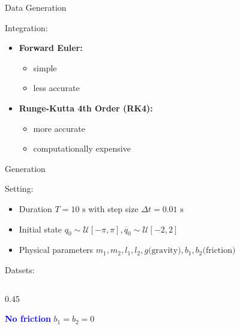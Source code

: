 \begin{frame}{Data Generation}

    Integration:
    \vspace{1ex} %
    \begin{itemize}
        \item \textbf{Forward Euler:}
        \begin{itemize}
            \item[\textcolor{ForestGreen}{\checkmark}] simple 
            \item[\textcolor{red}{$\times$}] less accurate 
        \end{itemize}
        \item \textbf{Runge-Kutta 4th Order (RK4):}
            \begin{itemize}
                \item[\textcolor{ForestGreen}{\checkmark}] more accurate
                \item[\textcolor{red}{$\times$}] computationally expensive
            \end{itemize}

    \end{itemize}

    \begin{block}{Generation}
        
        Setting:
        \begin{itemize}
            \item Duration $T = 10 \text{ s}$ with step size $\Delta t = 0.01 \text{ s}$
            \item Initial state $q_0 \sim \mathcal{U}[-\pi, \pi], \dot{q_0} \sim \mathcal{U}[-2,2]$
            \item Physical parameters $m_1, m_2, l_1, l_2, g \text{(gravity)}, b_1, b_2 \text{(friction)}$
        \end{itemize}
        
        Datsets:
        \begin{itemize}

            \begin{columns}[T]
                \begin{column}{0.45\textwidth}
                    \item[\textcolor{blue}{$\bullet$}] \textcolor{blue}{\textbf{No friction}} $b_1 = b_2 = 0$
                \end{column}
                

\end{columns}
\end{itemize}
\end{block}
\end{frame}
